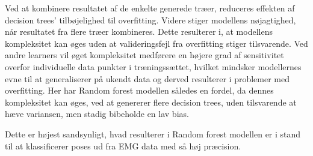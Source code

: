 Ved at kombinere resultatet af de enkelte generede træer, reduceres effekten af decision trees' tilbøjelighed til overfitting. Videre stiger modellens nøjagtighed, når resultatet fra flere træer kombineres. Dette resulterer i, at modellens kompleksitet kan øges uden at valideringsfejl fra overfitting stiger tilsvarende. 
Ved andre learners vil øget kompleksitet medførere en højere grad af sensitivitet overfor individuelle data punkter i træningssættet, hvilket mindsker modellernes evne til at generaliserer på ukendt data og derved resulterer i problemer med overfitting. Her har Random forest modellen således en fordel, da dennes kompleksitet kan øges, ved at genererer flere decision trees, uden tilsvarende at hæve variansen, men stadig bibeholde en lav bias. 

Dette er højest sandsynligt, hvad resulterer i Random forest modellen er i stand til at klassificerer poses ud fra EMG data med så høj præcision.   

